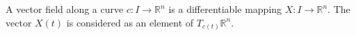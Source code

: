 A vector field along a curve $c: I \to \mathbb{R}^n$ is a differentiable mapping $X: I \to \mathbb{R}^n$. The vector $X(t)$ is considered as an element of $T_{c(t)}\mathbb{R}^n$.